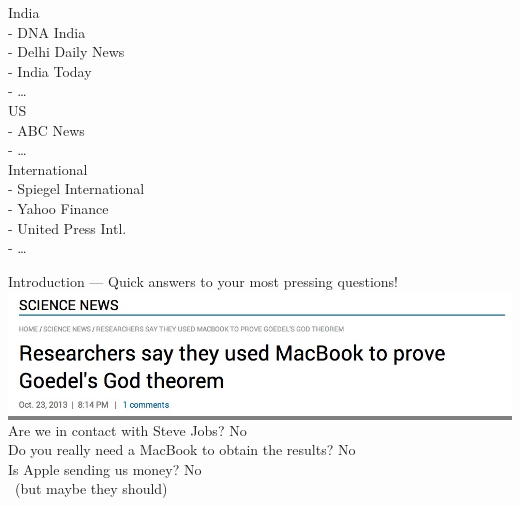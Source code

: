 \begin{frame}{}
\begin{minipage}{.3\textwidth}
India \\
- DNA India \\
- Delhi Daily News \\
- India Today \\
- \ldots \\

US \\
- ABC News \\
- \ldots \\

International \\
- Spiegel International \\
- Yahoo Finance \\
- United Press Intl. \\
- \ldots \\
\end{minipage}
\end{frame}

\begin{frame}{Introduction --- Quick answers to your most pressing questions!} \large
\colorbox{gray}{\includegraphics[width=\textwidth]{MacBookGrab}} 
\pause
\vfill
Are we in contact with Steve Jobs? \hfill No \\[2em]
Do you really need a MacBook to obtain the results? \hfill No \\[2em]
Is Apple sending us money? \hfill No \\
\, \hfill (but maybe they should)
\end{frame}


